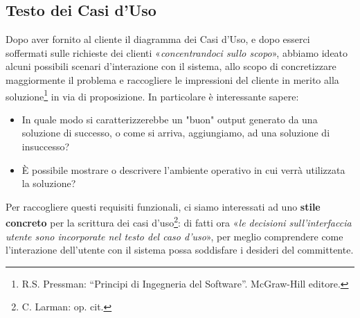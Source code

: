 \subsection{Testo dei Casi d'Uso}\label{subsec:usecasetext}
Dopo aver fornito al cliente il diagramma dei Casi d'Uso, e dopo esserci soffermati
sulle richieste dei clienti «\textit{concentrandoci sullo scopo}», abbiamo
ideato alcuni possibili scenari d'interazione con il sistema, allo scopo di
concretizzare maggiormente il problema e  raccogliere le impressioni
del cliente in merito alla soluzione\footnote{R.S. Pressman: ``Principi di Ingegneria del Software''. McGraw-Hill
editore.} in via di
proposizione. In particolare è interessante sapere:
\begin{itemize}
\item In quale modo si caratterizzerebbe un "buon" output generato da una 
	soluzione di successo, o come si arriva, aggiungiamo, ad una soluzione
	di insuccesso?
\item È possibile mostrare o descrivere l'ambiente operativo in cui verrà 
	utilizzata la soluzione?
\end{itemize}
Per raccogliere questi requisiti funzionali, ci siamo interessati ad uno
\textbf{stile concreto} per la scrittura dei casi d'uso\footnote{C. Larman: op. cit.}:
 di fatti ora  «\textit{le decisioni sull'interfaccia utente sono incorporate nel 
 testo del caso d'uso}», per meglio comprendere come l'interazione dell'utente 
 con il sistema possa soddisfare i desideri del committente.

\pagebreak

